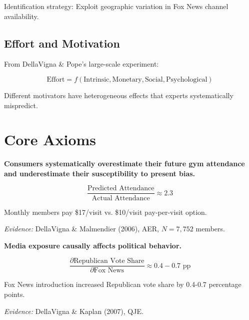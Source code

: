 Identification strategy: Exploit geographic variation in Fox News channel availability.

\subsection{Effort and Motivation}

From DellaVigna \& Pope's large-scale experiment:

\begin{equation}
\text{Effort} = f(\text{Intrinsic}, \text{Monetary}, \text{Social}, \text{Psychological})
\end{equation}

Different motivators have heterogeneous effects that experts systematically mispredict.

\section{Core Axioms}

\begin{tcolorbox}[colback=red!5!white,colframe=red!75!black,title=Axiom DV-1: Overconfidence in Self-Control]
\textbf{Consumers systematically overestimate their future gym attendance and underestimate their susceptibility to present bias.}

\begin{equation}
\frac{\text{Predicted Attendance}}{\text{Actual Attendance}} \approx 2.3
\end{equation}

Monthly members pay \$17/visit vs. \$10/visit pay-per-visit option.

\textit{Evidence:} DellaVigna \& Malmendier (2006), AER, $N=7,752$ members.
\end{tcolorbox}

\begin{tcolorbox}[colback=red!5!white,colframe=red!75!black,title=Axiom DV-2: Media Persuasion Effect]
\textbf{Media exposure causally affects political behavior.}

\begin{equation}
\frac{\partial \text{Republican Vote Share}}{\partial \text{Fox News}} \approx 0.4-0.7 \text{ pp}
\end{equation}

Fox News introduction increased Republican vote share by 0.4-0.7 percentage points.

\textit{Evidence:} DellaVigna \& Kaplan (2007), QJE.
\end{tcolorbox}

